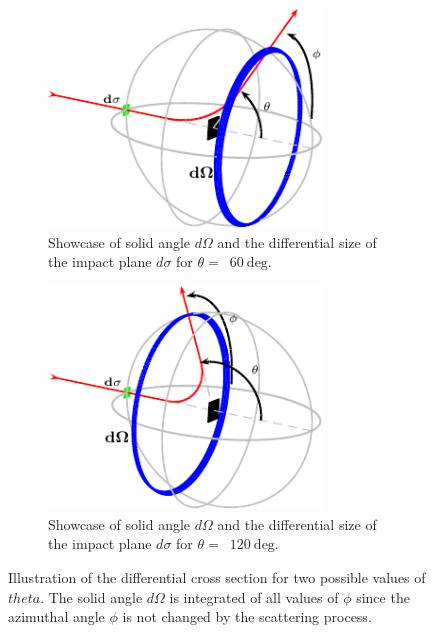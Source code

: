 \documentclass[a4paper,12pt,titlepage, twoside]{article}
\newcommand{\unit}[2]{$#1~\ensuremath{\mathrm{#2}}$}
\begin{document}
\begin{figure}
  \centering
  \begin{subfigure}{0.49\textwidth}
    \centering
    \includegraphics[width=0.8\textwidth]{./fig/compton_scattering_illustration_1.pdf}
    \caption{Showcase of solid angle $d\Omega$ and the differential size of the impact plane $d\sigma$ for $\theta=$~\unit{60}{deg}.}
    \label{fig:differential_cross_section_1}
  \end{subfigure}
  \begin{subfigure}{0.49\textwidth}
    \centering
    \includegraphics[width=0.8\textwidth]{./fig/compton_scattering_illustration_2.pdf}
    \caption{Showcase of solid angle $d\Omega$ and the differential size of the impact plane $d\sigma$ for $\theta=$~\unit{120}{deg}.}
    \label{fig:differential_cross_section_2}
  \end{subfigure}
  \caption{Illustration of the differential cross section for two possible values of $theta$. The solid angle $d\Omega$ is integrated of all values of $\phi$ since the azimuthal angle $\phi$ is not changed by the scattering process.}
  \label{fig:differential_cross_section}
\end{figure}
\end{document}
